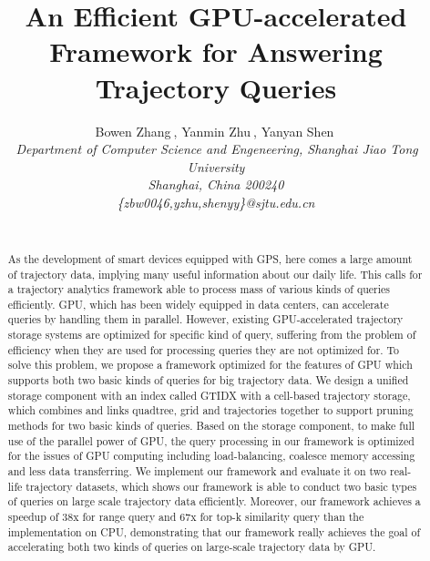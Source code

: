 \documentclass[10pt,conference,letterpaper]{IEEEtran}
\title{An Efficient GPU-accelerated Framework for Answering Trajectory Queries}
\author{%
{Bowen Zhang{\small $~$}, Yanmin Zhu{\small $~$}, Yanyan Shen{\small $~$} }%
\vspace{1.6mm}\\
\fontsize{10}{10}\selectfont\itshape
\,Department of Computer Science and Engeneering, Shanghai Jiao Tong University\\
Shanghai, China 200240\\
\fontsize{9}{9}\selectfont\ttfamily\upshape
%
\{zbw0046,yzhu,shenyy\}@sjtu.edu.cn\\
\vspace{1.2mm}\\
\fontsize{10}{10}\selectfont\rmfamily\itshape
}
\newcommand{\idxname}{GTIDX\xspace }
\begin{document}
\maketitle
%
\begin{abstract} 
As the development of smart devices equipped with GPS, here comes a large amount of trajectory data, implying many useful information about our daily life. This calls for a trajectory analytics framework able to process mass of various kinds of queries efficiently. GPU, which has been widely equipped in data centers, can accelerate queries by handling them in parallel. However, existing GPU-accelerated trajectory storage systems are optimized for specific kind of query, suffering from the problem of efficiency when they are used for processing queries they are not optimized for. To solve this problem, we propose a framework optimized for the features of GPU which supports both two basic kinds of queries for big trajectory data. We design a unified storage component with an index called \idxname with a cell-based trajectory storage, which combines and links quadtree, grid and trajectories together to support pruning methods for two basic kinds of queries. Based on the storage component, to make full use of the parallel power of GPU, the query processing in our framework is optimized for the issues of GPU computing including load-balancing, coalesce memory accessing and less data transferring. We implement our framework and evaluate it on two real-life trajectory datasets, which shows our framework is able to conduct two basic types of queries on large scale trajectory data efficiently. Moreover, our framework achieves a speedup of 38x for range query and 67x for top-k similarity query than the implementation on CPU, demonstrating that our framework really achieves the goal of accelerating both two kinds of queries on large-scale trajectory data by GPU.
\end{abstract}

%
%
%
%
%
\end{document}
